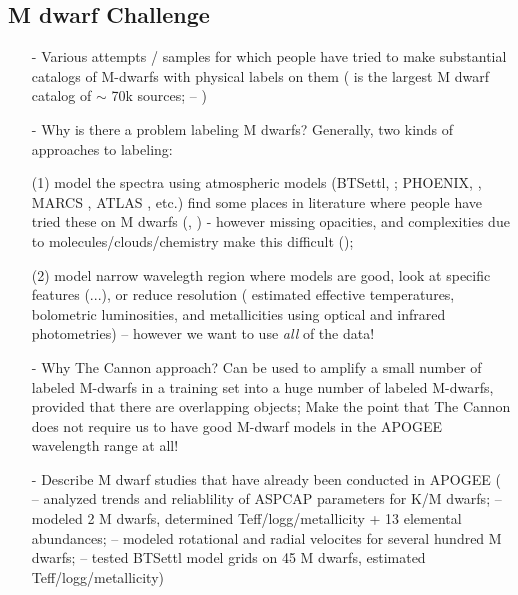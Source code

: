 \documentclass[modern]{aastex62}
\begin{document}
\subsection{M dwarf Challenge}
\begin{enumerate}
\item[-] Various attempts / samples for which people have tried to make substantial catalogs of M-dwarfs with physical labels on them (\citealt{West:2011} is the largest M dwarf catalog of $\sim$ 70k sources; \citealt{Deacon:2014} -- \color{red}{Need citations!}\color{black}) 

\item[-] Why is there a problem labeling M dwarfs? Generally, two kinds of approaches to labeling:

 (1) model the spectra using atmospheric models (BTSettl, \citealt{Allard:2011}; PHOENIX, \citealt{Husser:2013}, MARCS \citealt{Gustafsson:2008}, ATLAS \citealt{Castelli:2004}, etc.) find some places in literature where people have tried these on M dwarfs (\citealt{Rajpurohit:2014}, \citealt{Rajpurohit:2018}) - however missing opacities, and complexities due to molecules/clouds/chemistry make this difficult (\citealt{Allard:2013}); 

 (2) model narrow wavelegth region where models are good, look at specific features (\citealt{Rojas-Ayala:2012}...), or reduce resolution (\citealt{Casagrande:2008} estimated effective temperatures, bolometric luminosities, and metallicities using optical and infrared photometries) -- however we want to use \emph{all} of the data!


\item[-] Why The Cannon approach? Can be used to amplify a small number of labeled M-dwarfs in a training set into a huge number of labeled M-dwarfs, provided that there are overlapping objects; Make the point that The Cannon does not require us to have good M-dwarf models in the APOGEE wavelength range at all!

\item[-] Describe M dwarf studies that have already been conducted in APOGEE (\citealt{Schmidt:2016} -- analyzed trends and reliablility of ASPCAP parameters for K/M dwarfs; \citealt{Souto:2017} -- modeled 2 M dwarfs, determined Teff/logg/metallicity + 13 elemental abundances; \citealt{Desphande:2013} -- modeled rotational and radial velocites for several hundred M dwarfs; \citealt{Rajpurohit:2018} -- tested BTSettl model grids on 45 M dwarfs, estimated Teff/logg/metallicity)

\end{enumerate}
\end{document}
